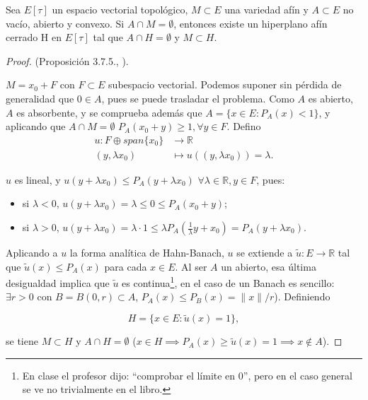 \begin{theorem}[Mazur]
  Sea $E[\tau]$ un espacio vectorial topológico, $M\subset E$ una variedad
  afín y $A\subset E$ no vacío, abierto y convexo. Si $A\cap M= \emptyset$,
  entonces existe un hiperplano afín cerrado H en $E[\tau]$ tal que $A\cap
  H=\emptyset$ y $M\subset H$.
\end{theorem}

\begin{proof} (Proposición 3.7.5., \cite{cascales2012}).

  $M=x_0+F$ con $F\subset E$ subespacio vectorial. Podemos suponer sin pérdida
  de generalidad que $0\in A$, pues se puede trasladar el problema. Como $A$ es
  abierto, $A$ es absorbente, y se comprueba además que $A=\{x\in E:P_A(x)<1\}
  $, y aplicando que $A\cap M=\emptyset$ $P_A(x_0+y)\ge  1, \forall y\in F$.
  Defino 
  \begin{align*}
    u: F\oplus span \{x_0\}  &\longrightarrow \mathbb{R} \\
    (y,\lambda x_0) &\longmapsto u((y,\lambda x_0)) = \lambda
  .\end{align*}
  
  $u$ es lineal, y $u(y+\lambda x_0) \le P_A(y+\lambda x_0)$ $\forall \lambda\in
  \mathbb{R},y\in F$, pues:

  \begin{itemize}
    \item si $\lambda < 0$, $u(y+\lambda x_0)=\lambda\le 0\le P_A(x_0+y)$;
    \item si $\lambda > 0$, $u(y+\lambda x_0)=\lambda \cdot 1 \le \lambda
      P_A(\frac{1}{\lambda}y+x_0)=P_A(y+\lambda x_0)$.
  \end{itemize}

  Aplicando a $u$ la forma analítica de Hahn-Banach, $u$ se extiende a
  $\tilde{u}:E\to \mathbb{R}$ tal que $\tilde{u}(x)\le P_A(x)$ para cada $x\in
  E$. Al ser $A$ un abierto, esa última desigualdad implica que $\tilde{u}$ es
  continua\footnote{En clase el profesor dijo: ``comprobar el límite en 0'', pero en
    el caso general se ve no trivialmente en el libro.}, en el caso de un
  Banach es sencillo: $\exists r>0$ con $B=B(0,r)\subset A$, $P_A(x)\le
  P_B(x)=\|x\|/r$). Definiendo

  \[
  H=\{x\in E: \tilde{u}(x)=1\}
  ,\] 

  se tiene $M\subset H$ y $A\cap H=\emptyset$ ($x\in H\implies P_A(x)\ge
  \tilde{u}(x)=1\implies x\not\in A$).
\end{proof}

